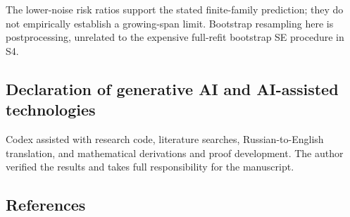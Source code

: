 \documentclass[
  american,
  11pt,
]{article}
\begin{document}
The lower-noise risk ratios support the stated finite-family prediction;
they do not empirically establish a growing-span limit. Bootstrap
resampling here is postprocessing, unrelated to the expensive full-refit
bootstrap SE procedure in S4.

\subsection{Declaration of generative AI and AI-assisted
technologies}\label{declaration-of-generative-ai-and-ai-assisted-technologies}

Codex assisted with research code, literature searches,
Russian-to-English translation, and mathematical derivations and proof
development. The author verified the results and takes full
responsibility for the manuscript.

\subsection*{References}\label{references}
\end{document}
